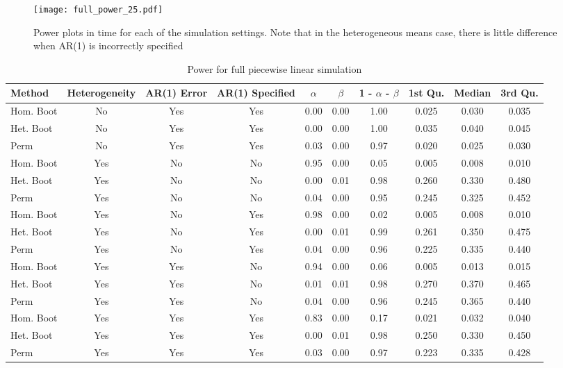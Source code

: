 \begin{figure}
\centering
\texttt{[image: full\_power\_25.pdf]}
\caption{Power plots in time for each of the simulation settings. Note that in the heterogeneous means case, there is little difference when AR(1) is incorrectly specified}
\label{fig:time_power_plot_full}
\end{figure}

\begin{landscape}
\begin{table}[ht]
\centering
\begin{tabular}{lccccccccc}
  \hline
Method & Heterogeneity & AR(1) Error & AR(1) Specified & $\alpha$ & $\beta$ & 1 - $\alpha$ - $\beta$ & 1st Qu. & Median & 3rd Qu.  \\ 
  \hline
Hom. Boot & No & Yes & Yes & 0.00 & 0.00 & 1.00 & 0.025 & 0.030 & 0.035 \\ 
  Het. Boot & No & Yes & Yes & 0.00 & 0.00 & 1.00 & 0.035 & 0.040 & 0.045 \\ 
  Perm & No & Yes & Yes & 0.03 & 0.00 & 0.97 & 0.020 & 0.025 & 0.030 \\ \hline
  Hom. Boot & Yes & No & No & 0.95 & 0.00 & 0.05 & 0.005 & 0.008 & 0.010 \\ 
  Het. Boot & Yes & No & No & 0.00 & 0.01 & 0.98 & 0.260 & 0.330 & 0.480 \\ 
  Perm & Yes & No & No & 0.04 & 0.00 & 0.95 & 0.245 & 0.325 & 0.452 \\ \hline
  Hom. Boot & Yes & No & Yes & 0.98 & 0.00 & 0.02 & 0.005 & 0.008 & 0.010 \\ 
  Het. Boot & Yes & No & Yes & 0.00 & 0.01 & 0.99 & 0.261 & 0.350 & 0.475 \\ 
  Perm & Yes & No & Yes & 0.04 & 0.00 & 0.96 & 0.225 & 0.335 & 0.440 \\ \hline
  Hom. Boot & Yes & Yes & No & 0.94 & 0.00 & 0.06 & 0.005 & 0.013 & 0.015 \\ 
  Het. Boot & Yes & Yes & No & 0.01 & 0.01 & 0.98 & 0.270 & 0.370 & 0.465 \\ 
  Perm & Yes & Yes & No & 0.04 & 0.00 & 0.96 & 0.245 & 0.365 & 0.440 \\ \hline
  Hom. Boot & Yes & Yes & Yes & 0.83 & 0.00 & 0.17 & 0.021 & 0.032 & 0.040 \\ 
  Het. Boot & Yes & Yes & Yes & 0.00 & 0.01 & 0.98 & 0.250 & 0.330 & 0.450 \\ 
  Perm & Yes & Yes & Yes & 0.03 & 0.00 & 0.97 & 0.223 & 0.335 & 0.428 \\ 
   \hline
\end{tabular}
\caption{Power for full piecewise linear simulation} 
\label{tab:power_methods_full}
\end{table}
\end{landscape}

